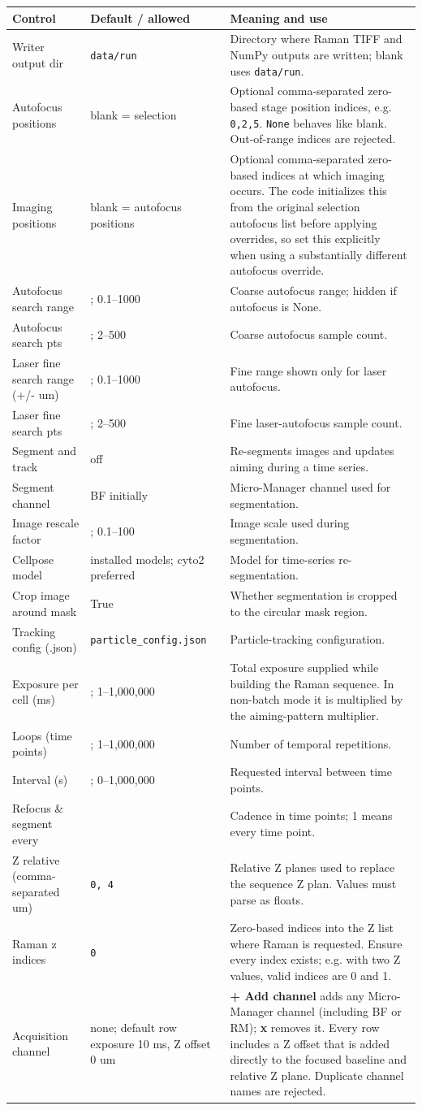 \documentclass[11pt,oneside]{report}
\makeatletter
\newcommand{\ui}[1]{\textbf{#1}}
\newcommand{\code}[1]{\texttt{#1}}
\newcommand{\fieldtable}{\begin{longtable}{@{}>{\raggedright\arraybackslash}p{0.25\textwidth}>{\raggedright\arraybackslash}p{0.18\textwidth}>{\raggedright\arraybackslash}p{0.50\textwidth}@{}}\toprule\textbf{Control} & \textbf{Default / allowed} & \textbf{Meaning and use}\\\midrule\endhead}
\newcommand{\endfieldtable}{\bottomrule\end{longtable}}
\makeatother
\begin{document}
\fieldtable
Writer output dir & \code{data/run} & Directory where Raman TIFF and NumPy outputs
are written; blank uses \code{data/run}.\\
Autofocus positions & blank = selection & Optional comma-separated zero-based stage
position indices, e.g. \code{0,2,5}. \code{None} behaves like blank. Out-of-range
indices are rejected.\\
Imaging positions & blank = autofocus positions & Optional comma-separated zero-based
indices at which imaging occurs. The code initializes this from the original
selection autofocus list before applying overrides, so set this explicitly when
using a substantially different autofocus override.\\
Autofocus search range & 6; 0.1--1000 & Coarse autofocus range; hidden if autofocus is None.\\
Autofocus search pts & 8; 2--500 & Coarse autofocus sample count.\\
Laser fine search range (+/- um) & 1.5; 0.1--1000 & Fine range shown only for laser autofocus.\\
Laser fine search pts & 8; 2--500 & Fine laser-autofocus sample count.\\
Segment and track & off & Re-segments images and updates aiming during a time series.\\
Segment channel & BF initially & Micro-Manager channel used for segmentation.\\
Image rescale factor & 2.0; 0.1--100 & Image scale used during segmentation.\\
Cellpose model & installed models; cyto2 preferred & Model for time-series re-segmentation.\\
Crop image around mask & True & Whether segmentation is cropped to the circular mask region.\\
Tracking config (.json) & \code{particle\_config.json} & Particle-tracking configuration.\\
Exposure per cell (ms) & 1000; 1--1,000,000 & Total exposure supplied while building
the Raman sequence. In non-batch mode it is multiplied by the aiming-pattern multiplier.\\
Loops (time points) & 100; 1--1,000,000 & Number of temporal repetitions.\\
Interval (s) & 600; 0--1,000,000 & Requested interval between time points.\\
Refocus \& segment every & 1 & Cadence in time points; 1 means every time point.\\
Z relative (comma-separated um) & \code{0, 4} & Relative Z planes used to replace
the sequence Z plan. Values must parse as floats.\\
Raman z indices & \code{0} & Zero-based indices into the Z list where Raman is
requested. Ensure every index exists; e.g. with two Z values, valid indices are 0 and 1.\\
Acquisition channel & none; default row exposure 10 ms, Z offset 0 um &
\ui{+ Add channel} adds any Micro-Manager channel (including BF or RM);
\ui{x} removes it. Every row includes a Z offset that is added directly to the
focused baseline and relative Z plane. Duplicate channel names are rejected.\\
\endfieldtable
\end{document}

